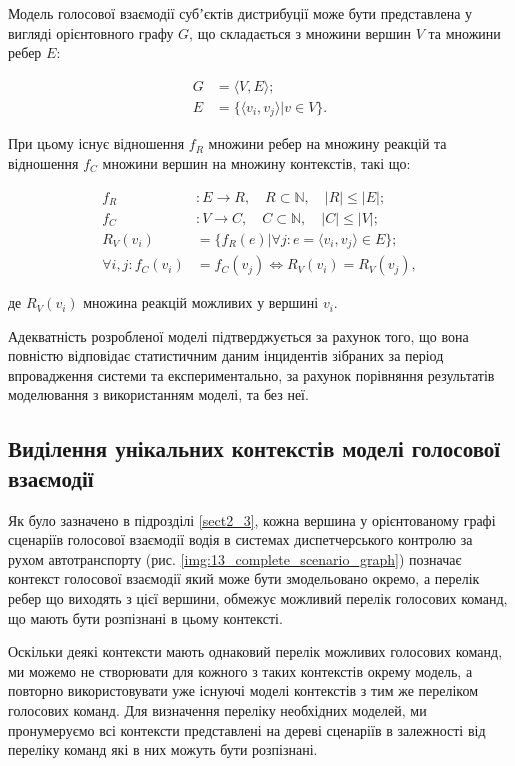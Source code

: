 Модель голосової взаємодії субʼєктів дистрибуції може бути представлена у вигляді орієнтовного графу $G$, що складається з множини вершин $V$ та множини ребер $E$:

\begin{align}
	G&=\langle V,E\rangle; \nonumber\\
	E&=\{\langle v_i,v_j\rangle | v \in V\}. \nonumber
\end{align}

При цьому існує відношення $f_R$ множини ребер на множину реакцій та відношення $f_C$ множини вершин на множину контекстів, такі що:

\begin{align}
	f_R&: E \rightarrow R,\quad R\subset\mathbb{N},\quad |R|\le|E|; \nonumber\\
	f_C&: V \rightarrow C,\quad C\subset\mathbb{N},\quad|C|\le|V|; \nonumber\\
	R_V(v_i) &= \{f_R(e)|\forall j:e=\langle v_i,v_j\rangle \in E\}; \nonumber\\
	\forall i,j: f_C(v_i)&=f_C(v_j) \iff R_V(v_i) = R_V(v_j), \nonumber
\end{align}

\noindent
де $R_V(v_i)$ множина реакцій можливих у вершині $v_i$.

Адекватність розробленої моделі підтверджується за рахунок того, що вона повністю відповідає статистичним даним інцидентів зібраних за період впровадження системи та експериментально, за рахунок порівняння результатів моделювання з використанням моделі, та без неї.

\subsection{Виділення унікальних контекстів моделі голосової взаємодії}

Як було зазначено в підрозділі \ref{sect2_3}, кожна вершина у орієнтованому графі сценаріїв голосової взаємодії водія в системах диспетчерського контролю за рухом автотранспорту (рис. \ref{img:13_complete_scenario_graph}) позначає контекст голосової взаємодії який може бути змодельовано окремо, а перелік ребер що виходять з цієї вершини, обмежує можливий перелік голосових команд, що мають  бути розпізнані в цьому контексті. 

Оскільки деякі контексти мають однаковий перелік можливих голосових команд, ми можемо не створювати для кожного з таких контекстів окрему модель, а повторно використовувати уже існуючі моделі контекстів з тим же переліком голосових команд. Для визначення переліку необхідних моделей, ми пронумеруємо всі контексти представлені на дереві сценаріїв в залежності від переліку команд які в них можуть бути розпізнані.

